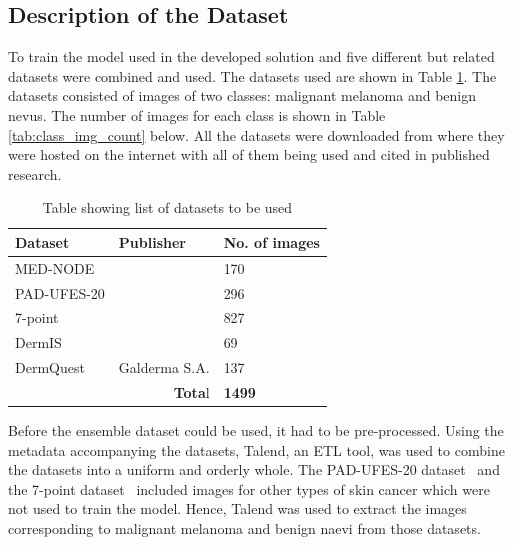 \documentclass[12pt, a4paper]{article}
\begin{document}
\subsection{Description of the Dataset}
To train the model used in the developed solution and five different but related datasets were combined and used. The datasets used are shown in Table \ref{tab:datasets2}. The datasets consisted of images of two classes: malignant melanoma and benign nevus. The number of images for each class is shown in Table \ref{tab:class_img_count} below. All the datasets were downloaded from where they were hosted on the internet with all of them being used and cited in published research.
\begin{table}[h]
    \centering
    \begin{tabular}{|l|l|l|}
        \hline
        \textbf{Dataset}                     & \textbf{Publisher}       & \textbf{No. of images} \\\hline
        MED-NODE                             & \cite{giotis2015med}     & 170                    \\\hline
        PAD-UFES-20                          & \cite{PACHECO2020103545} & 296                    \\\hline
        7-point                              & \cite{8333693}           & 827                    \\\hline
        DermIS                               & \cite{dermis}            & 69                     \\\hline
        DermQuest                            & Galderma S.A.            & 137                    \\\hline
        \multicolumn{2}{|r|}{\textbf{Tota}l} & \textbf{1499}                                     \\\hline
    \end{tabular}
    \caption{Table showing list of datasets to be used}
    \label{tab:datasets2}
\end{table}

Before the ensemble dataset could be used, it had to be pre-processed. Using the metadata accompanying the datasets, Talend, an ETL tool, was used to combine the datasets into a uniform and orderly whole. The PAD-UFES-20 dataset~\citep{PACHECO2020103545} and the 7-point dataset~\citep{8333693} included images for other types of skin cancer which were not used to train the model. Hence, Talend was used to extract the images corresponding to malignant melanoma and benign naevi from those datasets.
\end{document}
